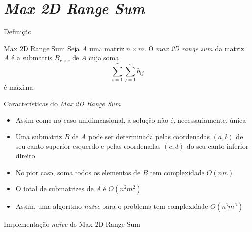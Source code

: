 \section{\it Max 2D Range Sum}

\begin{frame}[fragile]{Definição}

    \begin{block}{Max 2D Range Sum}
        Seja $A$ uma matriz $n \times m$. O \textit{max 2D range sum} da matriz $A$ é a submatriz
            $B_{r\times s}$ de $A$ cuja soma
        \[
            \sum_{i = 1}^r \sum_{j = 1}^s b_{ij}
        \]
        é máxima.
    \end{block}

\end{frame}

\begin{frame}[fragile]{Características do {\it Max 2D Range Sum}}

    \begin{itemize}
        \item Assim como no caso unidimensional, a solução não é, necessariamente, única

        \item Uma submatriz $B$ de $A$ pode ser determinada pelas coordenadas $(a, b)$ de seu canto
            superior esquerdo e pelas coordenadas $(c, d)$ do seu canto inferior direito

        \item No pior caso, soma todos os elementos de $B$ tem complexidade $O(nm)$

        \item O total de submatrizes de $A$ é $O(n^2m^2)$

        \item Assim, uma algoritmo  \textit{naive} para o problema tem complexidade $O(n^3m^3)$
    \end{itemize}

\end{frame}

\begin{frame}[fragile]{Implementação \textit{naive} do Max 2D Range Sum}
\end{frame}

